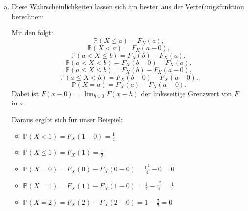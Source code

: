 \begin{uebsp}
\begin{Answer}
\begin{enumerate}[(a)]
{    	
    }
  
\item Diese Wahrscheinlichkeiten lassen sich am besten aus der Verteilungsfunktion berechnen:
    \begin{uebsp_theory}
        Mit den  folgt:
        \[\mathbb P(X\le a)=F_X(a),\]
        \[\mathbb P(X<a)=F_X(a-0),\]
        \[\mathbb P(a< X\le b)=F_X(b)-F_X(a),\]
        \[\mathbb P(a< X< b)=F_X(b-0)-F_X(a),\]
        \[\mathbb P(a\le X\le b)=F_X(b)-F_X(a-0),\]
        \[\mathbb P(a\le X< b)=F_X(b-0)-F_X(a-0).\]
        \[\mathbb P( X= a)=F_X(a)-F_X(a-0).\]
    Dabei ist $F(x-0)=\lim_{h\downarrow 0}F(x-h)$ der linksseitige Grenzwert
    von $F$ in $x$. \\
    \end{uebsp_theory}
    
    Daraus ergibt sich für unser Beispiel: \\
   	\begin{itemize}
   	\item $\mathbb{P}(X < 1)=F_X(1-0)=\frac{1}{4}$
   	\item $\mathbb{P}(X \le 1)=F_X(1)=\frac{1}{2}$
   	\item $\mathbb{P}(X = 0)=F_X(0)-F_X(0-0)=\frac{0^{2}}{4}-0=0$
   	\item $\mathbb{P}(X = 1)=F_X(1)-F_X(1-0)=\frac{1}{2}-\frac{1^{2}}{4}=\frac{1}{4}$
   	\item $\mathbb{P}(X = 2)=F_X(2)-F_X(2-0)=1-\frac{2}{2}=0$
   	\end{itemize}
    
\end{enumerate}
\end{Answer}
\end{uebsp}
